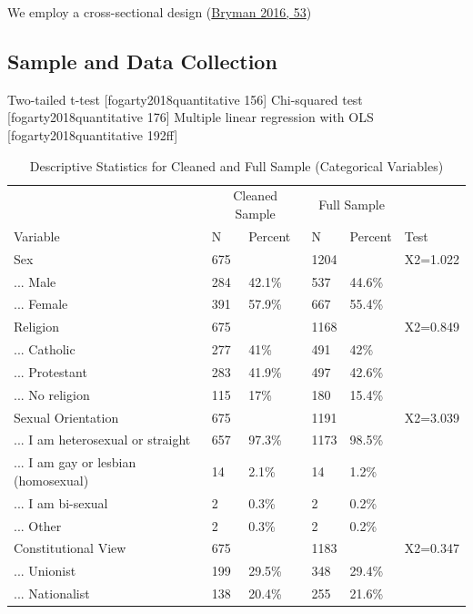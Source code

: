 \documentclass[
]{article}
\begin{document}
We employ a cross-sectional design
(\protect\hyperlink{ref-bryman2016social}{Bryman 2016, 53})

\hypertarget{sample-and-data-collection}{%
\subsection{Sample and Data
Collection}\label{sample-and-data-collection}}

Two-tailed t-test {[}fogarty2018quantitative 156{]} Chi-squared test
{[}fogarty2018quantitative 176{]} Multiple linear regression with OLS
{[}fogarty2018quantitative 192ff{]}

\begin{table}[H]

\caption{\label{tab:unnamed-chunk-1}Descriptive Statistics for Cleaned and Full Sample (Categorical Variables)}
\centering
\begin{tabular}[t]{llllll}
\toprule
\multicolumn{1}{c}{ } & \multicolumn{2}{c}{Cleaned Sample} & \multicolumn{2}{c}{Full Sample} & \multicolumn{1}{c}{ } \\
\cmidrule(l{3pt}r{3pt}){2-3} \cmidrule(l{3pt}r{3pt}){4-5}
Variable & N & Percent & N & Percent & Test\\
\midrule
Sex & 675 &  & 1204 &  & X2=1.022\\
... Male & 284 & 42.1\% & 537 & 44.6\% & \\
... Female & 391 & 57.9\% & 667 & 55.4\% & \\
Religion & 675 &  & 1168 &  & X2=0.849\\
... Catholic & 277 & 41\% & 491 & 42\% & \\
\addlinespace
... Protestant & 283 & 41.9\% & 497 & 42.6\% & \\
... No religion & 115 & 17\% & 180 & 15.4\% & \\
Sexual Orientation & 675 &  & 1191 &  & X2=3.039\\
... I am heterosexual or straight & 657 & 97.3\% & 1173 & 98.5\% & \\
... I am gay or lesbian (homosexual) & 14 & 2.1\% & 14 & 1.2\% & \\
\addlinespace
... I am bi-sexual & 2 & 0.3\% & 2 & 0.2\% & \\
... Other & 2 & 0.3\% & 2 & 0.2\% & \\
Constitutional View & 675 &  & 1183 &  & X2=0.347\\
... Unionist & 199 & 29.5\% & 348 & 29.4\% & \\
... Nationalist & 138 & 20.4\% & 255 & 21.6\% & \\

\end{tabular}
\end{table}
\end{document}
